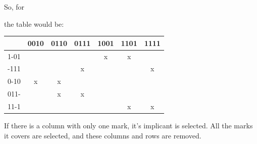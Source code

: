 \documentclass[nobib]{tufte-handout}
\begin{document}
    So, for\\
    \begin{center}
    \end{center}
    the table would be:
    \begin{center}
        \begin{table}
            \centering
            \begin{tabular}{c|c c c c c c}
                     & 0010 & 0110 & 0111 & 1001 & 1101 & 1111 \\
                \hline
                1-01 &      &      &      & x    & x    &      \\
                -111 &      &      & x    &      &      & x    \\
                0-10 & x    & x    &      &      &      &      \\
                011- &      & x    & x    &      &      &      \\
                11-1 &      &      &      &      & x    & x    \\
            \end{tabular}
        \end{table}
    \end{center}
    If there is a column with only one mark, it's implicant is selected. All the marks it covers are selected, and these columns and rows are removed.\\
\end{document}

